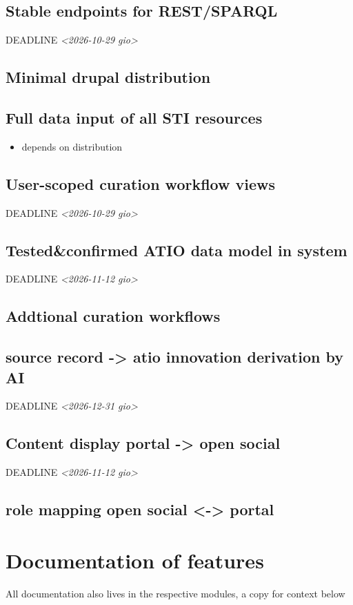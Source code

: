 \documentclass{scrartcl}
\begin{document}
\subsection{Stable endpoints for REST/SPARQL}
\label{sec:orgd6b00fa}
DEADLINE \textit{<2026-10-29 gio>}
\subsection{Minimal drupal distribution}
\label{sec:org75f992f}
\subsection{Full data input of all STI resources}
\label{sec:orgf89930f}
\begin{itemize}
\item depends on distribution
\end{itemize}
\subsection{User-scoped curation workflow views}
\label{sec:orgd07a97a}
DEADLINE \textit{<2026-10-29 gio>}
\subsection{Tested\&confirmed ATIO data model in system}
\label{sec:org364216c}
DEADLINE \textit{<2026-11-12 gio>}
\subsection{Addtional curation workflows}
\label{sec:org606320f}
\subsection{source record -> atio innovation derivation by AI}
\label{sec:org48f7d11}
DEADLINE \textit{<2026-12-31 gio>}
\subsection{Content display portal -> open social}
\label{sec:orgf488257}
DEADLINE \textit{<2026-11-12 gio>}
\subsection{role mapping open social <-> portal}
\label{sec:org04d66b8}
\section{Documentation of features}
\label{sec:orgf939d2f}
All documentation also lives in the respective modules, a copy for context below
\end{document}
